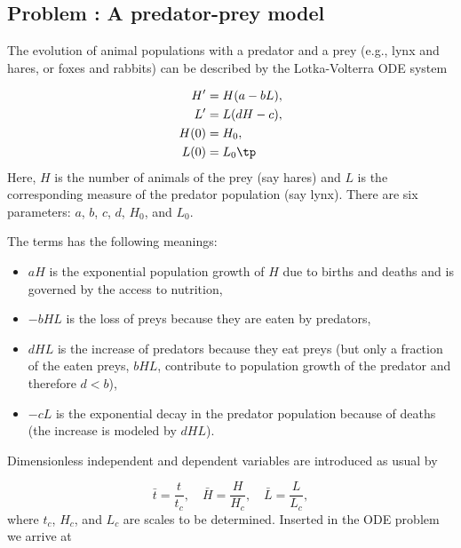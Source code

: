 \documentclass[graybox,envcountchap,sectrefs,final]{svmonodo}
\newcounter{doconce:movie:counter}
\newenvironment{doconceexercise}{}{}
\newcounter{doconceexercisecounter}
\begin{document}
\begin{doconceexercise}

\subsection*{Problem \thedoconceexercisecounter: A predator-prey model}

\label{scale:decay:exer:predprey}


The evolution of animal populations with a predator and a prey (e.g.,
lynx and hares, or foxes and rabbits) can be described by the
Lotka-Volterra ODE system

\begin{align}
H^{\prime} &= H(a - bL),
\label{scale:decay:exer:predprey:eqH}\\ 
L^{\prime} &= L(dH - c),
\label{scale:decay:exer:predprey:eqL}\\ 
H(0)&=H_0,\\ 
L(0)&=L_0\tp
\end{align}
Here, $H$ is the number of animals of the prey (say hares)
and $L$ is the corresponding measure of the predator population (say lynx).
There are six parameters: $a$, $b$, $c$, $d$, $H_0$, and $L_0$.

The terms has the following meanings:

\begin{itemize}
 \item $aH$ is the exponential
   population growth of $H$ due to births and deaths and is governed by
   the access to nutrition,

 \item $-bHL$ is the loss of preys because they are eaten by predators,

 \item $dHL$ is the increase of predators because they eat preys (but only
   a fraction of the eaten preys, $bHL$, contribute to population growth
   of the predator and therefore $d < b$),

 \item $-cL$ is the exponential decay in the predator population because of
   deaths (the increase is modeled by $dHL$).
\end{itemize}

\noindent
Dimensionless independent and dependent variables are introduced as usual
by

\[ \bar t = \frac{t}{t_c},\quad
\bar H = \frac{H}{H_c},\quad \bar L = \frac{L}{L_c},
\]
where $t_c$, $H_c$, and $L_c$ are scales to be determined. Inserted
in the ODE problem we arrive at


\end{doconceexercise}
\end{document}
